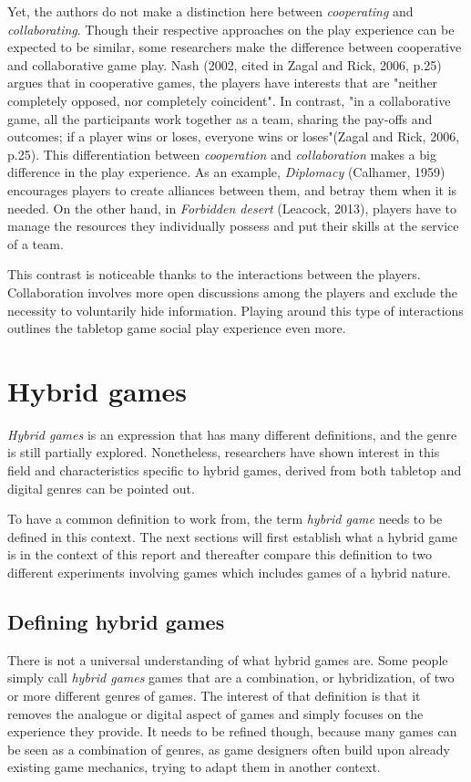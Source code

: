 Yet, the authors do not make a distinction here between \textit{cooperating} and \textit{collaborating}. Though their respective approaches on the play experience can be expected to be similar, some researchers make the difference between cooperative and collaborative game play. 
Nash (2002, cited in Zagal and Rick, 2006, p.25)\cite{art:collab} argues that in cooperative games, the players have interests that are "neither completely opposed, nor completely coincident". 
In contrast, "in a collaborative game, all the participants work together as a team, sharing the pay-offs and outcomes; if a player wins or loses, everyone wins or loses"(Zagal and Rick, 2006, p.25)\cite{art:collab}. 
This differentiation between \textit{cooperation} and \textit{collaboration} makes a big difference in the play experience. As an example, \textit{Diplomacy} (Calhamer, 1959)\cite{game:diplo} encourages players to create alliances between them, and betray them when it is needed. On the other hand, in \textit{Forbidden desert} (Leacock, 2013)\cite{game:desert}, players have to manage the resources they individually possess and put their skills at the service of a team. 

This contrast is noticeable thanks to the interactions between the players. Collaboration involves more open discussions among the players and exclude the necessity to voluntarily hide information. Playing around this type of interactions outlines the tabletop game social play experience even more.

\section{Hybrid games}
\textit{Hybrid games} is an expression that has many different definitions, and the genre is still partially explored. Nonetheless, researchers have shown interest in this field and characteristics specific to hybrid games, derived from both tabletop and digital genres can be pointed out.

To have a common definition to work from, the term \textit{hybrid game} needs to be defined in this context. The next sections will first establish what a hybrid game is in the context of this report and thereafter compare this definition to two different experiments involving games which includes games of a hybrid nature.

\subsection{Defining hybrid games}
There is not a universal understanding of what hybrid games are. Some people simply call \textit{hybrid games} games that are a combination, or hybridization, of two or more different genres of games. The interest of that definition is that it removes the analogue or digital aspect of games and simply focuses on the experience they provide. It needs to be refined though, because many games can be seen as a combination of genres, as game designers often build upon already existing game mechanics, trying to adapt them in another context. 

